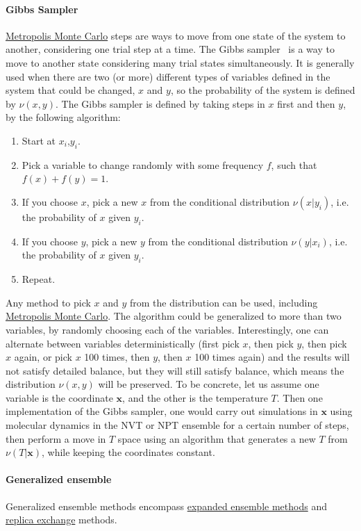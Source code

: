 \documentclass[9pt,review]{livecoms}
\newcommand{\vx}{\mathbf{x}}
\begin{document}
\hypertarget{ref:GibbsSampler} {\paragraph{Gibbs Sampler}}
\hyperlink{ref:MetropolisMonteCarlo} {Metropolis Monte Carlo} steps are ways to move from one state of the system to another, considering one trial step at a time.  The Gibbs sampler~\cite{shirts_gibbssamp} is a  way to move to another state considering many trial states simultaneously. It is generally used when there are two (or more) different types of variables defined in the system that could be changed, $x$ and $y$, so the probability of the system is defined by $\nu(x,y)$. The Gibbs sampler is defined by taking steps in $x$ first and then $y$, by the following algorithm:
\begin{enumerate}
\item Start at $x_i$,$y_i$.
\item Pick a variable to change randomly with some frequency $f$, such that $f(x)+f(y)=1$.
\item If you choose $x$, pick a new $x$ from the conditional distribution $\nu(x|y_i)$, i.e. the probability of $x$ given $y_i$.
\item If you choose $y$, pick a new $y$ from the conditional distribution $\nu(y|x_i)$, i.e. the probability of $x$ given $y_i$.
\item Repeat.
\end{enumerate}
Any method to pick $x$ and $y$ from the distribution can be used, including \hyperlink{ref:MetropolisMonteCarlo} {Metropolis Monte Carlo}. The algorithm could be generalized to more than two variables, by randomly choosing each of the variables. Interestingly, one can alternate between variables deterministically (first pick $x$, then pick $y$, then pick $x$ again, or pick $x$ 100 times, then $y$, then $x$ 100 times again) and the results will not satisfy detailed balance, but they will still satisfy balance, which means the distribution $\nu(x,y)$ will be preserved.
To be concrete, let us assume one variable is the coordinate $\vx$, and the other is the temperature $T$. Then one implementation of the Gibbs sampler, one would carry out simulations in $\vx$ using molecular dynamics in the NVT or NPT ensemble for a certain number of steps, then perform a move in $T$ space using an algorithm that generates a new $T$ from $\nu(T|\vx)$, while keeping the coordinates constant.

\hypertarget{ref:GenEns} {\paragraph{Generalized ensemble}}
Generalized ensemble methods encompass \hyperlink{ref:ExpEns} {expanded ensemble methods} and \hyperlink{ref:ReplEx} {replica exchange} methods. 
\end{document}
